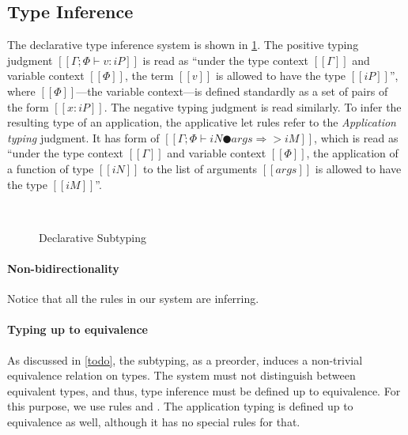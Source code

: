 \subsection{Type Inference}

The declarative type inference system is shown in \cref{fig:declarative-inference}.
The positive typing judgment $[[Γ ; Φ ⊢ v : iP]]$ is read as 
``under the type context $[[Γ]]$ and variable context $[[Φ]]$,
the term $[[v]]$ is allowed to have the type $[[iP]]$'',
where $[[Φ]]$---the variable context---is defined standardly as
a set of pairs of the form $[[x : iP]]$. 
The negative typing judgment is read similarly.
To infer the resulting type of an application, the
applicative let rules refer to the \emph{Application typing} judgment.
It has form of $[[Γ ; Φ ⊢ iN ● args ⇒> iM]]$, 
which is read as ``under the type context $[[Γ]]$ and variable context $[[Φ]]$,
the application of a function of type $[[iN]]$ to the list of arguments $[[args]]$
is allowed to have the type $[[iM]]$''.

\begin{figure}[h]
  \ottdefnDTNInf{}

  \hfill

  \begin{multicols}{2}
  \ottdefnDTPInf{}
  \\
  \ottdefnDTSpinInf{}
  \end{multicols}
  \hfill

  \caption{Declarative Subtyping}
  \label{fig:declarative-inference}
\end{figure}

\paragraph{Non-bidirectionality}
  Notice that all the rules in our system are inferring.

\paragraph{Typing up to equivalence}
  As discussed in \cref{todo}, the subtyping, as a preorder, 
  induces a non-trivial equivalence relation on types. 
  The system must not distinguish between equivalent types,
  and thus, type inference must be defined up to equivalence. 
  For this purpose, we use rules   
  and .
  The application typing is defined up to equivalence as well,
  although it has no special rules for that.

